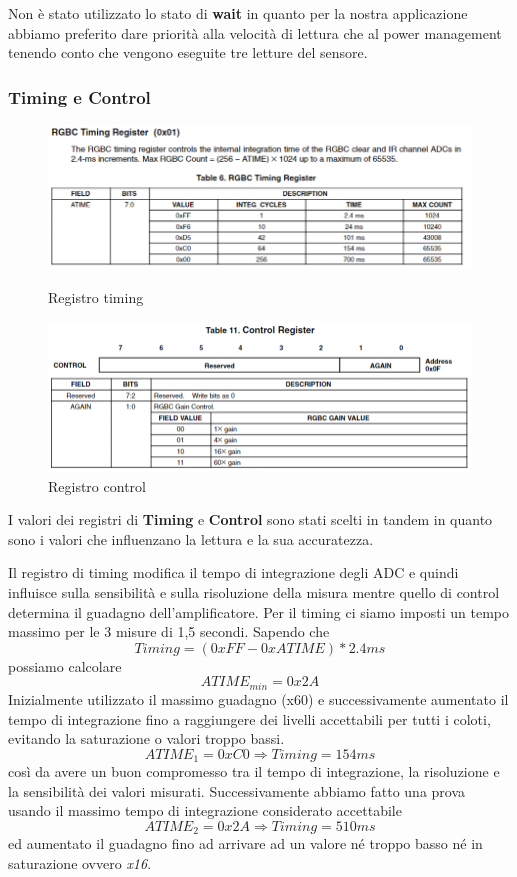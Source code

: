 \documentclass[12pt]{report}
\begin{document}
Non è stato utilizzato lo stato di \textbf{wait} in quanto per la nostra applicazione abbiamo preferito dare priorità alla velocità di lettura che al power management tenendo conto che vengono eseguite tre letture del sensore.

\subsubsection{Timing e Control}

\begin{figure}[h]
    \centering
    \includegraphics[width=0.65\linewidth]{images/Immagini sensore/registro timing.png}
    \caption{Registro timing}
    \includegraphics[width=0.65\linewidth]{images/Immagini sensore/registro control.png}
    \caption{Registro control}
    \end{figure}

    I valori dei registri di \textbf{Timing} e \textbf{Control} sono stati scelti in tandem in quanto sono i valori che influenzano la lettura e la sua accuratezza. 

    Il registro di timing modifica il tempo di integrazione degli ADC e quindi influisce sulla sensibilità e sulla risoluzione della misura mentre quello di control determina il guadagno dell'amplificatore. 
    Per il timing ci siamo imposti un tempo massimo per le 3 misure di 1,5 secondi. Sapendo che \[Timing = (0xFF - 0xATIME) * 2.4ms\] possiamo calcolare \[ATIME_{min} = 0x2A\] 
    Inizialmente utilizzato il massimo guadagno (x60) e successivamente aumentato il tempo di integrazione fino a raggiungere dei livelli accettabili per tutti i coloti, evitando la saturazione o valori troppo bassi.
    \[ATIME_{1} = 0xC0 \Rightarrow Timing = 154ms\] 
    così da avere un buon compromesso tra il tempo di integrazione, la risoluzione e la sensibilità dei valori misurati. 
    Successivamente abbiamo fatto una prova usando il massimo tempo di integrazione considerato accettabile \[ATIME_{2} = 0x2A \Rightarrow Timing = 510ms\] ed aumentato il guadagno fino ad arrivare ad un valore 
    né troppo basso né in saturazione ovvero \emph{x16}.
\end{document}
